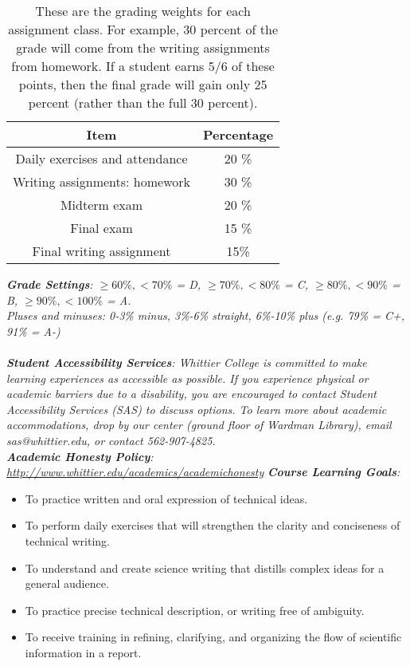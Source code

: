 \documentclass[10pt]{article}
\begin{document}
\begin{table}[h]
\centering
\begin{tabular}{| c | c |}
\hline
Item & Percentage \\ \hline \hline
Daily exercises and attendance & 20 \% \\ \hline
Writing assignments: homework & 30 \% \\ \hline
Midterm exam & 20 \% \\ \hline
Final exam & 15 \% \\ \hline
Final writing assignment & 15\% \\ \hline
\end{tabular}
\caption{\label{tab:grades} These are the grading weights for each assignment class.  For example, 30 percent of the grade will come from the writing assignments from homework.  If a student earns 5/6 of these points, then the final grade will gain only 25 percent (rather than the full 30 percent).}
\end{table}
\textit{\textbf{Grade Settings}: $\geq 60\%, <70\%$ = D, $\geq 70\%, <80\%$ = C, $\geq 80\%, <90\%$ = B, $\geq 90\%, <100\%$ = A.  \\ Pluses and minuses: 0-3\% minus, 3\%-6\% straight, 6\%-10\% plus (e.g. 79\% = C+, 91\% = A-)} \\ \\
\textit{\textbf{Student Accessibility Services}: Whittier College is committed to make learning experiences as accessible as possible. If you experience physical or academic barriers due to a disability, you are encouraged to contact Student Accessibility Services (SAS) to discuss options. To learn more about academic accommodations, drop by our center (ground floor of Wardman Library), email sas@whittier.edu, or contact 562-907-4825.} \\
\textit{\textbf{Academic Honesty Policy}: \url{http://www.whittier.edu/academics/academichonesty}}
\clearpage
\textit{\textbf{Course Learning Goals}:}
\begin{itemize}
\item To practice written and oral expression of technical ideas.
\item To perform daily exercises that will strengthen the clarity and conciseness of technical writing.
\item To understand and create science writing that distills complex ideas for a general audience.
\item To practice precise technical description, or writing free of ambiguity.
\item To receive training in refining, clarifying, and organizing the flow of scientific information in a report.
\end{itemize}
\end{document}
